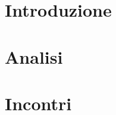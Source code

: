 \documentclass[a4paper, oneside, dvipsnames, table]{article}
\begin{document}
\copertina
\tableofcontents
\newpage 
\section{Introduzione}
    

\newpage
\section{Analisi}
    

\newpage
\section{Incontri}
    
\end{document}
